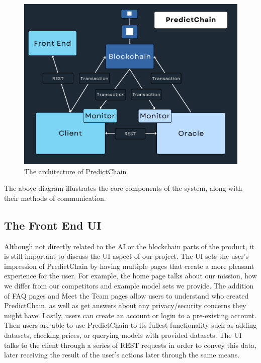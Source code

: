 \documentclass{article}
\begin{document}
    \begin{figure}[H]
        \begin{center}
            \begin{minipage}{0.6\textwidth}
            \centering
            \includegraphics[width=\linewidth]{../../img/detailedDiagram}
            \caption{The architecture of PredictChain}\label{Fig:detailedDiagram}
        \end{minipage}\hfill
        \end{center}
    \end{figure}

    The above diagram illustrates the core components of the system, along with their methods of communication.

    \subsection{The Front End UI}
    Although not directly related to the AI or the blockchain parts of the product, it is still important to discuss the
    UI aspect of our project. The UI sets the user's impression of PredictChain by having multiple pages that create a more
    pleasant experience for the user. For example, the home page talks about our mission, how we differ from our
    competitors and example model sets we provide. The addition of FAQ pages and Meet the Team pages allow users to
    understand who created PredictChain, as well as get answers about any privacy/security concerns they might have.
    Lastly, users can create an account or login to a pre-existing account. Then users are able to use PredictChain
    to its fullest functionality such as adding datasets, checking prices, or querying models with provided datasets.
    The UI talks to the client through a series of REST requests in order to convey this data, later receiving the
    result of the user's actions later through the same means.
\end{document}
